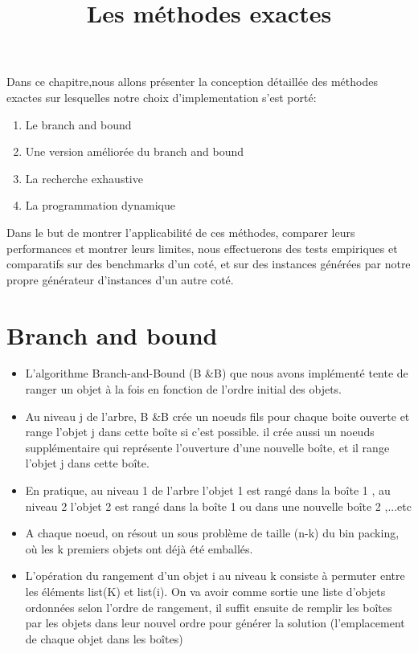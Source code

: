 \documentclass[12pt]{article}
\title{Les méthodes exactes}
\begin{document}
\maketitle

Dans ce chapitre,nous allons présenter la conception détaillée des méthodes exactes sur lesquelles notre choix d'implementation s'est porté:

\begin{enumerate}

\item Le branch and bound

\item Une version améliorée du branch and bound

\item La recherche exhaustive

\item La programmation dynamique
\end{enumerate}
Dans le but de montrer l’applicabilité de ces méthodes, comparer leurs performances et montrer leurs limites, nous effectuerons des tests empiriques et comparatifs sur des benchmarks d’un coté, et sur des instances générées par notre propre générateur d’instances d’un autre coté.
\section{Branch and bound}
\begin{itemize}
    \item L'algorithme Branch-and-Bound (B \&B) que nous avons implémenté tente de ranger un objet à la fois en fonction de l’ordre initial des objets. 
    \item Au niveau j de l’arbre, B \&B crée un noeuds fils pour chaque boite ouverte et range l’objet j dans cette boîte si c’est possible. il crée aussi un noeuds supplémentaire qui représente l’ouverture d’une nouvelle boîte, et il range l’objet j dans cette boîte.
    \item En pratique, au niveau 1 de l’arbre l’objet 1 est rangé dans la boîte 1 , au niveau 2 l’objet 2 est rangé dans la boîte 1 ou dans une nouvelle boîte 2 ,...etc 
    \item A chaque noeud, on résout un sous problème de taille (n-k) du bin packing, où les k premiers objets ont déjà été emballés.
    \item L’opération du rangement d’un objet i au niveau k consiste à permuter entre les éléments list(K) et list(i). On va avoir comme sortie une liste d’objets ordonnées selon l’ordre de rangement, il suffit ensuite de remplir les boîtes par les objets dans leur nouvel ordre pour générer la solution (l’emplacement de chaque objet dans les boîtes) 
\end{itemize}
\end{document}
